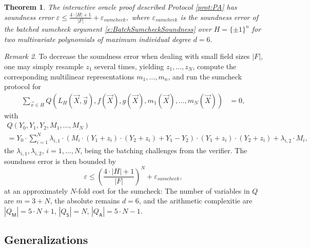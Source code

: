 \documentclass[11pt]{article}
\newtheorem{thm}{Theorem}[]
\theoremstyle{definition}
\theoremstyle{remark}
\newtheorem{rem}[thm]{Remark}
\begin{document}
\begin{thm}
\label{thm:PAsoundness}
 The interactive oracle proof described Protocol \ref{prot:PA} has soundness error
$
\varepsilon \leq \frac{4\cdot |H| + 1}{|F|} + \varepsilon_{sumcheck},
$
where $\varepsilon_{sumcheck}$ is the soundness error of the batched sumcheck argument \eqref{e:BatchSumcheckSoundness} over $H=\{\pm 1\}^n$ for two multivariate polynomials of maximum individual degree $d=6$.
\end{thm}
\begin{rem}
To decrease the soundness error when dealing with small field sizes $|F|$, one may simply resample $z_1$ several times, yielding $z_{1}, \ldots, z_N$, compute the corresponding multilinear representations $m_1, \ldots, m_n$,  and run the sumcheck protocol for
\begin{align} 
\label{e:sumcheckm}
	\sum_{\vec x \in H} Q(L_H(\vec X, \vec y), f(\vec X),  g(\vec X), m_1(\vec X),  \ldots,  m_N(\vec X))&= 0,
\end{align}
with
\begin{multline*}
Q(Y_0 , Y_1, Y_{2}, M_1, \ldots, M_N) 
\\=   
Y_0 \cdot\sum_{i=1}^N \lambda_{i,1}\cdot   \left(M_i\cdot (Y_1 + z_i)\cdot (Y_2+z_i) + Y_1 -  Y_2 \right)\cdot  (Y_1+z_i) \cdot (Y_2 + z_i) +  \lambda_{i,2} \cdot M_i,
\end{multline*}
the $\lambda_{i,1}, \lambda_{i,2}$, $i=1,\ldots, N$, being the batching challenges from the verifier.
The soundness error is then bounded by 
\[
\varepsilon \leq \left(\frac{4\cdot |H| + 1}{|F|}\right)^N + \varepsilon_{sumcheck},
\]
at an approximately  $N$-fold cost for the sumcheck:
The number of variables in $Q$ are  $m= 3 + N$, the absolute remains $d=6$, and the arithmetic complexitie are 
$|Q_\mathsf M|= 5\cdot N + 1$, $|Q_\mathsf S| = N$,  $|Q_\mathsf A|= 5 \cdot N - 1$.
\end{rem}

\subsection{Generalizations}
\label{s:PAGeneralizations}
\end{document}
